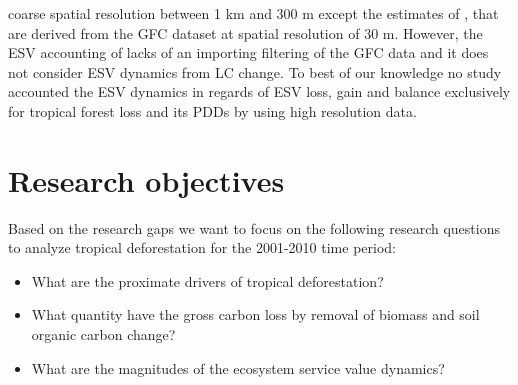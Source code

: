 coarse spatial resolution between 1 km and 300 m except the estimates of \citet{Song2018}, that are derived from the \ac{GFC} dataset at spatial resolution of 30 m. However, the \ac{ESV} accounting of \citet{Song2018} lacks of an importing filtering of the \ac{GFC} data and it does not consider \ac{ESV} dynamics from \ac{LC} change. To best of our knowledge no study accounted the \ac{ESV} dynamics in regards of \ac{ESV} loss, gain and balance exclusively for tropical forest loss and its \acp{PDD} by using high resolution data.

	\section{Research objectives}
		Based on the research gaps we want to focus on the following research questions to analyze tropical deforestation for the 2001-2010 time period:
		\begin{itemize}
			\item What are the proximate drivers of tropical deforestation?
			\item What quantity have the gross carbon loss by removal of biomass and soil organic carbon change?
			\item What are the magnitudes of the ecosystem service value dynamics?
		\end{itemize}

